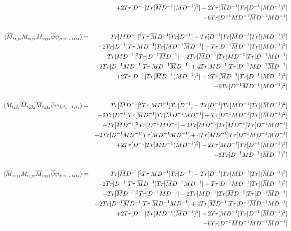 \documentclass[a4paper,10pt]{report}
\newcommand{\ol}[1]{\overline{#1}}
\newcommand{\Mb}{\ol{M}}
\newcommand{\mv}[1]{\langle #1 \rangle}
\newcommand{\ppb}{\ol{\psi}\psi}
\newcommand{\D}{D^{-1}}
\begin{document}
\begin{eqnarray}
&& + 2 Tr[\D]Tr[\Mb\D(M\D)^2] + 2 Tr[\Mb\D]Tr[\D(M\D)^2]\nonumber\\
&& - 6 Tr[\D M\D\Mb\D M\D]\nonumber\\
\nonumber\\
\hspace*{-19mm}\mv{\Mb_{i_1j_1}M_{i_2j_2}M_{i_3j_3} \ppb_{j_1i_1...i_4i_4}} &=&
Tr[M\D]^2Tr[\Mb\D]Tr[\D] - Tr[\D]Tr[\Mb\D]Tr[(M\D)^2]\nonumber\\
&& - 2 Tr[\D]Tr[M\D]Tr[M\D \Mb\D]  + Tr[\D\Mb\D]Tr[(M\D)^2]\nonumber\\
&& - Tr[M\D]^2Tr[\D \Mb\D] - 2 Tr[\Mb\D]Tr[M\D]Tr[\D M\D]\nonumber\\
&& + 2 Tr[\D M \D] Tr[M\D \Mb \D] +  4 Tr[M\D] Tr[\D M\D\Mb\D] \nonumber\\
&& + 2 Tr[\D]Tr[\Mb\D(M\D)^2] + 2 Tr[\Mb\D]Tr[\D(M\D)^2]\nonumber\\
&& - 6 Tr[\D\Mb\D(M\D)^2]\nonumber\\
\nonumber\\
\hspace*{-19mm}\mv{M_{i_1j_1}\Mb_{i_2j_2}\Mb_{i_3j_3} \ppb_{j_1i_1...i_4i_4}} &=&
Tr[\Mb\D]^2Tr[M\D]Tr[\D] - Tr[\D]Tr[M\D]Tr[(\Mb\D)^2]\nonumber\\
&& - 2 Tr[\D]Tr[\Mb\D]Tr[\Mb\D M\D]  + Tr[\D M\D]Tr[(\Mb\D)^2]\nonumber\\
&& - Tr[\Mb\D]^2Tr[\D M\D] - 2 Tr[M\D]Tr[\Mb\D]Tr[\D \Mb\D]\nonumber\\
&& + 2 Tr[\D \Mb \D] Tr[\Mb\D M \D] +  4 Tr[\Mb\D] Tr[\D \Mb\D M\D] \nonumber\\
&& + 2 Tr[\D]Tr[M\D(\Mb\D)^2] + 2 Tr[M\D]Tr[\D(\Mb\D)^2]\nonumber\\
&& - 6 Tr[\D M\D(\Mb\D)^2]\nonumber\\
\nonumber\\
\hspace*{-19mm}\mv{\Mb_{i_1j_1}M_{i_2j_2}\Mb_{i_3j_3} \ppb_{j_1i_1...i_4i_4}} &=&
Tr[\Mb\D]^2Tr[M\D]Tr[\D] - Tr[\D]Tr[M\D]Tr[(\Mb\D)^2]\nonumber\\
&& - 2 Tr[\D]Tr[\Mb\D]Tr[\Mb\D M\D]  + Tr[\D M\D]Tr[(\Mb\D)^2]\nonumber\\
&& - Tr[\Mb\D]^2Tr[\D M\D] - 2 Tr[M\D]Tr[\Mb\D]Tr[\D \Mb\D]\nonumber\\
&& + 2 Tr[\D \Mb \D] Tr[\Mb\D M \D] +  4 Tr[\Mb\D] Tr[\D \Mb\D M\D] \nonumber\\
&& + 2 Tr[\D]Tr[M\D(\Mb\D)^2] + 2 Tr[M\D]Tr[\D(\Mb\D)^2]\nonumber\\
&& - 6 Tr[\D\Mb\D M\D\Mb\D]\nonumber\\

\end{eqnarray}
\end{document}
